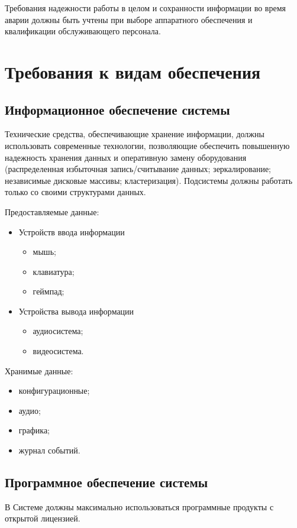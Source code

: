 Требования надежности работы в целом и сохранности информации во время аварии должны быть 
учтены при выборе аппаратного обеспечения и квалификации обслуживающего персонала.

\section{Требования к видам обеспечения}
\subsection{Информационное обеспечение системы}
Технические средства, обеспечивающие хранение информации, должны использовать современные 
технологии, позволяющие обеспечить повышенную надежность хранения данных и оперативную замену 
оборудования (распределенная избыточная запись/считывание данных; зеркалирование; независимые 
дисковые массивы; кластеризация). Подсистемы должны работать только со своими структурами данных.

Предоставляемые данные:
\begin{itemize}
    \item Устройств ввода информации
    \begin{itemize}
        \item мышь;
        \item клавиатура;
        \item геймпад;
    \end{itemize}
    \item Устройства вывода информации
    \begin{itemize}
        \item аудиосистема;
        \item видеосистема.
    \end{itemize}
\end{itemize}

Хранимые данные:
\begin{itemize}
    \item конфигурационные;
    \item аудио;
    \item графика;
    \item журнал событий.
\end{itemize}

\subsection{Программное обеспечение системы}
В Системе должны максимально использоваться программные продукты с открытой лицензией. 

